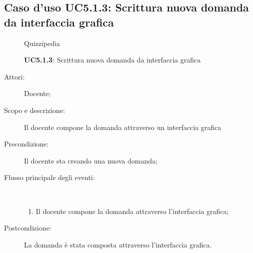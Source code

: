 \subsection{Caso d'uso UC5.1.3: Scrittura nuova domanda da interfaccia grafica}
	\begin{figure}[H]
		\centering
		\begin{resizedtikzpicture}{\textwidth}
		\begin{umlsystem}[x=0, fill=lightgray!20]{Quizzipedia}
		\end{umlsystem}
		\end{resizedtikzpicture}
		\caption{\textbf{UC5.1.3}: Scrittura nuova domanda da interfaccia grafica}
		\label{UC5.1.3}
	\end{figure}
\begin{description}
\item[Attori:] Docente;
\item[Scopo e descrizione:] Il docente compone la domanda attraverso un interfaccia grafica
      \item[Precondizione:] Il docente sta creando una nuova domanda;

        \item[Flusso principale degli eventi:] \ 
 \begin{enumerate}
          \item Il docente compone la domanda attraverso l'interfaccia grafica;

      \end{enumerate}
    \item[Postcondizione:] La domanda è stata composta attraverso l'interfaccia grafica.
  \end{description}
\hypertarget{UC5.2}{}
